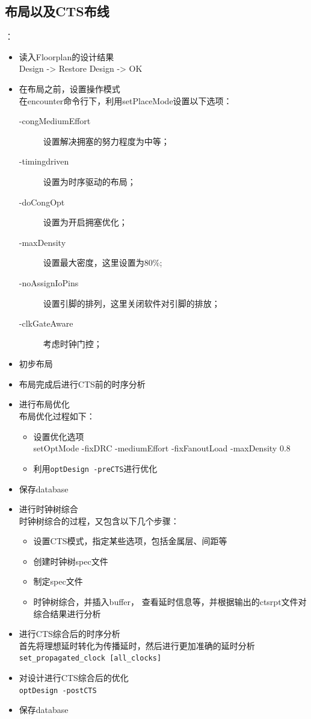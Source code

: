 \documentclass[a4paper,12pt]{report}
\begin{document}
\subsection{布局以及CTS布线}
：
\begin{itemize}
\item 读入Floorplan的设计结果\\
	Design -> Restore Design -> OK
\item 在布局之前，设置操作模式\\
	在encounter命令行下，利用setPlaceMode设置以下选项：
\begin{description}
\item[-congMediumEffort] 设置解决拥塞的努力程度为中等；
\item[-timingdriven] 设置为时序驱动的布局；
\item[-doCongOpt] 设置为开启拥塞优化；
\item[-maxDensity] 设置最大密度，这里设置为80\%;
\item[-noAssignIoPins] 设置引脚的排列，这里关闭软件对引脚的排放；
\item[-clkGateAware] 考虑时钟门控； 
\end{description}
\item 初步布局
\item 布局完成后进行CTS前的时序分析
\item 进行布局优化\\
布局优化过程如下：
\begin{itemize}
\item 设置优化选项\\
	setOptMode -fixDRC -mediumEffort -fixFanoutLoad -maxDensity 0.8
\item 利用\verb|optDesign -preCTS|进行优化
\end{itemize}
\item 保存database
\item 进行时钟树综合\\
时钟树综合的过程，又包含以下几个步骤：
\begin{itemize}
\item 设置CTS模式，指定某些选项，包括金属层、间距等
\item 创建时钟树spec文件
\item 制定spec文件
\item 时钟树综合，并插入buffer， 查看延时信息等，并根据输出的ctsrpt文件对综合结果进行分析
\end{itemize}
\item 进行CTS综合后的时序分析\\
首先将理想延时转化为传播延时，然后进行更加准确的延时分析\\ 
\verb|set_propagated_clock [all_clocks]|
\item 对设计进行CTS综合后的优化\\
\verb|optDesign -postCTS|
\item 保存database
\end{itemize}
\end{document}
